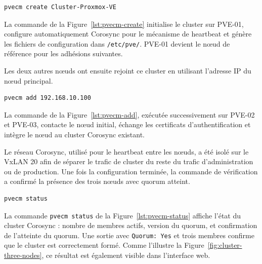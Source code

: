 \begin{lstlisting}[style=sonacode,language=bash,caption={Création du cluster Proxmox},label={lst:pvecm-create}]
pvecm create Cluster-Proxmox-VE
\end{lstlisting}

\par La commande de la Figure~\ref{lst:pvecm-create} initialise le cluster sur PVE-01, configure automatiquement Corosync pour le mécanisme de heartbeat et génère les fichiers de configuration dans \texttt{/etc/pve/}. PVE-01 devient le nœud de référence pour les adhésions suivantes.\\

\par Les deux autres nœuds ont ensuite rejoint ce cluster en utilisant l'adresse IP du nœud principal.\\

\begin{lstlisting}[style=sonacode,language=bash,caption={Jonction de PVE-02 et PVE-03 au cluster},label={lst:pvecm-add}]
pvecm add 192.168.10.100
\end{lstlisting}

\par La commande de la Figure~\ref{lst:pvecm-add}, exécutée successivement sur PVE-02 et PVE-03, contacte le nœud initial, échange les certificats d'authentification et intègre le nœud au cluster Corosync existant.\\

\par Le réseau Corosync, utilisé pour le heartbeat entre les nœuds, a été isolé sur le VxLAN 20 afin de séparer le trafic de cluster du reste du trafic d'administration ou de production. Une fois la configuration terminée, la commande de vérification a confirmé la présence des trois nœuds avec quorum atteint.\\

\begin{lstlisting}[style=sonacode,language=bash,caption={Vérification de l'état du cluster},label={lst:pvecm-status}]
pvecm status
\end{lstlisting}

\par La commande \texttt{pvecm status} de la Figure~\ref{lst:pvecm-status} affiche l'état du cluster Corosync : nombre de membres actifs, version du quorum, et confirmation de l'atteinte du quorum. Une sortie avec \texttt{Quorum: Yes} et trois membres confirme que le cluster est correctement formé. Comme l'illustre la Figure~\ref{fig:cluster-three-nodes}, ce résultat est également visible dans l'interface web.\\

